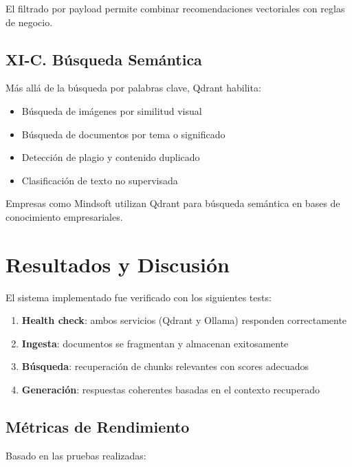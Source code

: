\documentclass[conference]{IEEEtran}
\begin{document}
El filtrado por payload permite combinar recomendaciones vectoriales con reglas de negocio.

\subsection{XI-C. Búsqueda Semántica}

Más allá de la búsqueda por palabras clave, Qdrant habilita:

\begin{itemize}
    \item Búsqueda de imágenes por similitud visual
    \item Búsqueda de documentos por tema o significado
    \item Detección de plagio y contenido duplicado
    \item Clasificación de texto no supervisada
\end{itemize}

Empresas como Mindsoft utilizan Qdrant para búsqueda semántica en bases de conocimiento empresariales.

\section{Resultados y Discusión}
\label{sec:resultados}

El sistema implementado fue verificado con los siguientes tests:

\begin{enumerate}
    \item \textbf{Health check}: ambos servicios (Qdrant y Ollama) responden correctamente
    \item \textbf{Ingesta}: documentos se fragmentan y almacenan exitosamente
    \item \textbf{Búsqueda}: recuperación de chunks relevantes con scores adecuados
    \item \textbf{Generación}: respuestas coherentes basadas en el contexto recuperado
\end{enumerate}

\subsection{Métricas de Rendimiento}

Basado en las pruebas realizadas:
\end{document}
